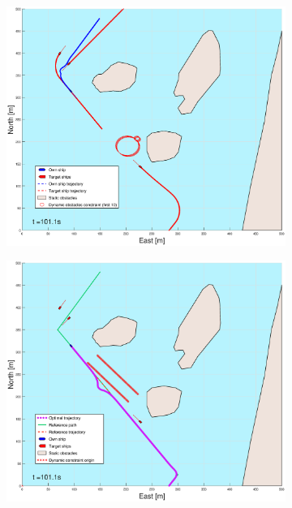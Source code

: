 \begin{figure}[!ht]
\begin{subfigure}[b]{0.494\textwidth}
        \subcaption{}
    \end{subfigure}
    \hfill
    \\
    \begin{subfigure}[b]{0.494\textwidth}
        \centering
        \includegraphics[width=\textwidth]{Images/Figures/Helloya_Rev/_Simple_1fig1_time=101}
        \subcaption{}
    \end{subfigure}
    \hfill
    \begin{subfigure}[b]{0.494\textwidth}
        \centering
        \includegraphics[width=\textwidth]{Images/Figures/Helloya_Rev/_Simple_1fig999_time=101}
        \subcaption{}
    \end{subfigure}
    \hfill
\end{figure}%
